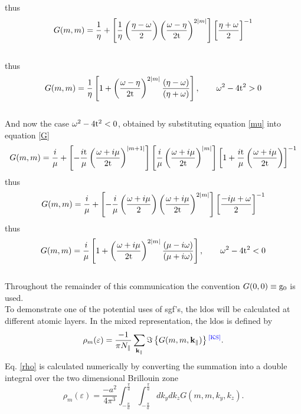 \documentclass[a4paper, 12pt]{article}
\newcommand{\site}[1]{\textsuperscript{\textcolor{blue}{\cite{#1}}}}
\begin{document}
thus
\begin{equation}
G(m,m)= \frac{1}{\eta}+\left[ \frac{1}{\eta}\left(\frac{\eta -\omega}{2}\right)\left(\frac{\omega -\eta}{2\rm t}\right)^{2|m|}\right]\left[\frac{\eta+\omega}{2}\right]^{-1}
\end{equation}
\\
thus
\begin{equation}
	G(m,m)= \frac{1}{\eta}\left[1+\left(\frac{\omega -\eta}{2\rm t}\right)^{2|m|}\frac{\left(\eta-\omega\right)}{\left(\eta+\omega\right)}\right] , \qquad \omega^2 -4{\rm t}^2>0
\end{equation}
\\
And now the case $\omega^2-4{\rm t}^2<0$, obtained by substituting equation \eqref{mu} into equation \eqref{G}
\begin{equation}
G(m,m)= \frac{i}{\mu}+\left[ -\frac{i\rm t}{\mu}\left(\frac{\omega +i\mu}{2\rm t}\right)^{|m+1|}\right]\left[\frac{i}{\mu}\left(\frac{\omega +i\mu}{2\rm t}\right)^{|m|}\right]\left[1+\frac{i\rm t}{\mu}\left(\frac{\omega +i\mu}{2\rm t}\right)\right]^{-1}
\end{equation}
thus
\begin{equation}
G(m,m)= \frac{i}{\mu}+\left[ -\frac{i}{\mu}\left(\frac{\omega+i\mu}{2}\right)\left(\frac{\omega +i\mu}{2\rm t}\right)^{2|m|}\right]\left[\frac{-i\mu +\omega}{2}\right]^{-1}
\end{equation}
thus
\begin{equation}
	G(m,m)= \frac{i}{\mu}\left[1+\left(\frac{\omega +i\mu}{2\rm t}\right)^{2|m|}\frac{\left(\mu-i\omega\right)}{\left(\mu+i\omega\right)}\right], \qquad \omega^2-4{\rm t}^2<0
\end{equation}
\\
Throughout the remainder of this communication the convention $ G(0,0)\equiv {\rm{g_0}}$ is used.
\\[2mm]To demonstrate one of the potential uses of \gls{sgf}'s, the \acrfull{ldos} will be calculated at different atomic layers.
In the mixed representation, the \gls{ldos} is defined by
\begin{equation}\label{rho}
	\rho_m(\varepsilon)=\frac{-1}{\pi N_\parallel}\sum_{\bf k_\parallel} \Im\left\{ G(m,m,{\bf k_\parallel})\right\}\site{KS}.
\end{equation}
Eq. \eqref{rho} is calculated numerically by converting the summation into a double integral over the two dimensional Brillouin zone
\begin{equation}
	\rho_m(\varepsilon)=\frac{-a^2}{4\pi^3} \int_{-\frac{\pi}{a}}^{\frac{\pi}{a}}\int_{-\frac{\pi}{a}}^{\frac{\pi}{a}} dk_y dk_z  G(m,m,k_y,k_z).
\end{equation}
\end{document}
